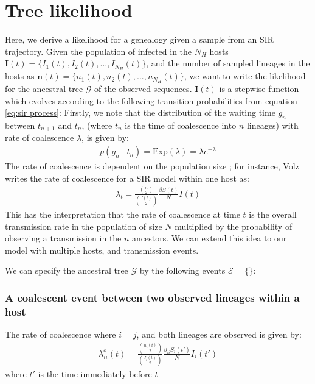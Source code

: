 \documentclass[a4paper,18pt]{report}
\begin{document}
\section{Tree likelihood}
Here, we derive a likelihood for a genealogy given a sample from an SIR trajectory. Given the population of infected in the $N_H$ hosts $\mathbf{I}(t) = \{I_1(t), I_2(t),...,I_{N_H}(t)\}$,  and the number of sampled lineages in the hosts as $\mathbf{n}(t)=\{n_1(t), n_2(t), ... , n_{N_H}(t)\}$, we want to write the likelihood for the ancestral tree $\mathcal{G}$ of the observed sequences.  $\mathbf{I}(t)$ is a stepwise function which evolves according to the following transition probabilities from equation \ref{eq:sir process}:
Firstly, we note that the distribution of the waiting time $g_n$ between $t_{n+1}$ and $t_n$, (where $t_n$ is the time of coalescence into $n$ lineages) with rate of coalescence $\lambda$, is given by:
\begin{eqnarray}
p(g_n\mid t_n) = \textrm{Exp}(\lambda) = \lambda e^{-\lambda} 
\end{eqnarray}
The rate of coalescence is dependent on the population size ;  for instance, Volz \cite{Volz2009} writes the rate of coalescence for a SIR model within one host as:
\begin{eqnarray}
\lambda_t = \frac{{n \choose 2}}{{I(t) \choose 2}}  \frac{\beta S(t)}{N}I(t)
\end{eqnarray}
This has the interpretation that the rate of coalescence at time $t$ is the overall transmission rate in the population of size $N$ multiplied by the probability of observing a transmission in the $n$ ancestors. We can extend this idea to our model with multiple hosts, and transmission events.

We can specify the ancestral tree $\mathcal{G}$ by the following events $\mathcal{E}=\{\}$: 
\subsubsection{A coalescent event between two observed lineages within a host}
The rate of coalescence where $i=j$, and both lineages are observed is given by:
\begin{eqnarray}
\lambda_{ii}^o(t) =  \frac{{n_i(t) \choose 2}}{{I_i(t) \choose 2}}  \frac{\beta_{ii} S_i(t')}{N}I_i(t')
\end{eqnarray}
where $t'$ is the time immediately before $t$
\end{document}
